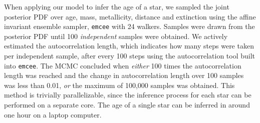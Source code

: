 When applying our model to infer the age of a star, we sampled the joint
posterior PDF over age, mass, metallicity, distance and extinction using the
affine invariant ensemble sampler, {\tt emcee} \citep{foreman-mackey2013} with
24 walkers.
Samples were drawn from the posterior PDF until 100 {\it independent} samples
were obtained.
We actively estimated the autocorrelation length, which indicates how many
steps were taken per independent sample, after every 100 steps using the
autocorrelation tool built into {\tt emcee}.
The MCMC concluded when {\it either} 100 times the autocorrelation length was
reached and the change in autocorrelation length over 100 samples was less
than 0.01, {\it or} the maximum of 100,000 samples was obtained.
This method is trivially parallelizable, since the inference process for each
star can be performed on a separate core.
The age of a single star can be inferred in around one hour on a laptop
computer.


